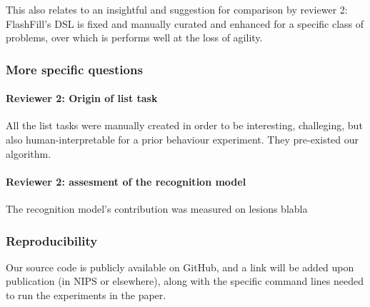 \documentclass{article}
\begin{document}


This also relates to an insightful
and suggestion for comparison by reviewer 2: FlashFill's DSL is fixed and
manually curated and enhanced for a specific class of problems, over which is
performs well at the loss of agility.


\subsubsection*{More specific questions}

\paragraph*{Reviewer 2: Origin of list task} All the list tasks were manually
created in order to be interesting, challeging, but also human-interpretable for
a prior behaviour experiment. They pre-existed our algorithm.

\paragraph*{Reviewer 2: assesment of the recognition model} The recognition
model's contribution was measured on lesions blabla


\subsubsection*{Reproducibility}
Our source code is publicly available on GitHub,
and a link will be added upon publication (in NIPS or elsewhere),
along with the specific command lines  needed to run
the experiments in the paper.

\end{document}
